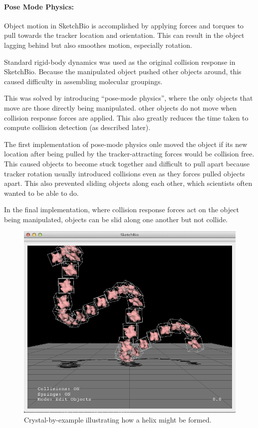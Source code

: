 \documentclass[twocolumn]{bmcart}%
\begin{document}
\paragraph*{Pose Mode Physics:}
Object motion in SketchBio is accomplished by applying forces and torques to pull towards the tracker location and orientation.
This can result in the object lagging behind but also smoothes motion, especially rotation.

Standard rigid-body dynamics was used as the original collision response in SketchBio. Because the manipulated object pushed other objects around, this caused difficulty in assembling molecular groupings.

This was solved by introducing ``pose-mode physics'', where the only objects that move are those directly being manipulated.
other objects do not move when collision response forces are applied.
This also greatly reduces the time taken to compute collision detection (as described later).

The first implementation of pose-mode physics onle moved the object if its new location after being pulled by the tracker-attracting forces would be collision free.
This caused objects to become stuck together and difficult to pull apart because tracker rotation usually introduced collisions even as they forces pulled objects apart.
This also prevented sliding objects along each other, which scientists often wanted to be able to do.

In the final implementation, where collision response forces act on the object being manipulated, objects can be slid along one another but not collide.

\begin{figure}[h]
\centering
\includegraphics[width=0.9\columnwidth]{crystalByExample.png}
\caption{Crystal-by-example illustrating how a helix might be formed.}
\label{fig:crystal_by_example}
\end{figure}
\end{document}
